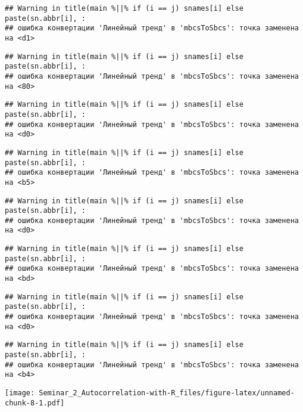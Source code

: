 \documentclass[
]{article}
\newenvironment{Shaded}{\begin{snugshade}}{\end{snugshade}}
\newcommand{\AttributeTok}[1]{\textcolor[rgb]{0.13,0.29,0.53}{#1}}
\newcommand{\DecValTok}[1]{\textcolor[rgb]{0.00,0.00,0.81}{#1}}
\newcommand{\FunctionTok}[1]{\textcolor[rgb]{0.13,0.29,0.53}{\textbf{#1}}}
\newcommand{\NormalTok}[1]{#1}
\newcommand{\SpecialCharTok}[1]{\textcolor[rgb]{0.81,0.36,0.00}{\textbf{#1}}}
\newcommand{\StringTok}[1]{\textcolor[rgb]{0.31,0.60,0.02}{#1}}
\begin{document}
\begin{verbatim}
## Warning in title(main %||% if (i == j) snames[i] else paste(sn.abbr[i], :
## ошибка конвертации 'Линейный тренд' в 'mbcsToSbcs': точка заменена на <d1>
\end{verbatim}

\begin{verbatim}
## Warning in title(main %||% if (i == j) snames[i] else paste(sn.abbr[i], :
## ошибка конвертации 'Линейный тренд' в 'mbcsToSbcs': точка заменена на <80>
\end{verbatim}

\begin{verbatim}
## Warning in title(main %||% if (i == j) snames[i] else paste(sn.abbr[i], :
## ошибка конвертации 'Линейный тренд' в 'mbcsToSbcs': точка заменена на <d0>
\end{verbatim}

\begin{verbatim}
## Warning in title(main %||% if (i == j) snames[i] else paste(sn.abbr[i], :
## ошибка конвертации 'Линейный тренд' в 'mbcsToSbcs': точка заменена на <b5>
\end{verbatim}

\begin{verbatim}
## Warning in title(main %||% if (i == j) snames[i] else paste(sn.abbr[i], :
## ошибка конвертации 'Линейный тренд' в 'mbcsToSbcs': точка заменена на <d0>
\end{verbatim}

\begin{verbatim}
## Warning in title(main %||% if (i == j) snames[i] else paste(sn.abbr[i], :
## ошибка конвертации 'Линейный тренд' в 'mbcsToSbcs': точка заменена на <bd>
\end{verbatim}

\begin{verbatim}
## Warning in title(main %||% if (i == j) snames[i] else paste(sn.abbr[i], :
## ошибка конвертации 'Линейный тренд' в 'mbcsToSbcs': точка заменена на <d0>
\end{verbatim}

\begin{verbatim}
## Warning in title(main %||% if (i == j) snames[i] else paste(sn.abbr[i], :
## ошибка конвертации 'Линейный тренд' в 'mbcsToSbcs': точка заменена на <b4>
\end{verbatim}

\texttt{[image: Seminar\_2\_Autocorrelation-with-R\_files/figure-latex/unnamed-chunk-8-1.pdf]}

\begin{Shaded}
\end{Shaded}
\end{document}
